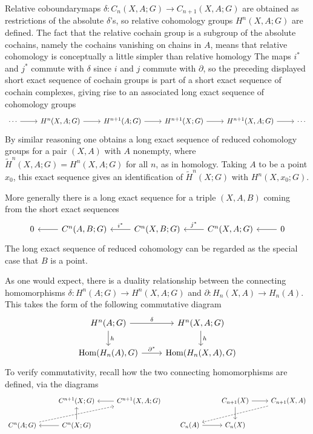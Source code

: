 Relative coboundarymaps $\delta:C_n(X,A;G)\to C_{n+1}(X,A;G)$ are obtained as restrictions of the absolute $\delta$'s, so relative cohomology groups $H^n(X,A;G)$ are defined. The fact that the relative cochain group is a subgroup of the absolute cochains, namely the cochains vanishing on chains in $A$, means that relative cohomology is conceptually a little simpler than relative homology The maps $i^*$ and $j^*$ commute with $\delta$ since $i$ and $j$ commute with $\partial$, so the preceding displayed short exact sequence of cochain groups is part of a short exact sequence of cochain complexes, giving rise to an associated long exact sequence of cohomology groups
\[\begin{tikzcd}
\cdots\ar[r]&H^n(X,A;G)\ar[r]&H^{n+1}(A;G)\ar[r]&H^{n+1}(X;G)\ar[r]&H^{n+1}(X,A;G)\ar[r]&\cdots
\end{tikzcd}\]
By similar reasoning one obtains a long exact sequence of reduced cohomology groups for a pair $(X,A)$ with $A$ nonempty, where $\widetilde{H}^n(X,A;G)=H^n(X,A;G)$ for all $n$, as in homology. Taking $A$ to be a point $x_0$, this exact sequence gives an identification of $\widetilde{H}^n(X;G)$ with $H^n(X,x_0;G)$.\par
More generally there is a long exact sequence for a triple $(X,A,B)$ coming from
the short exact sequences
\[\begin{tikzcd}
0&C^n(A,B;G)\ar[l]&C^n(X,B;G)\ar[l,swap,"i^*"]&C^n(X,A;G)\ar[l,swap,"j^*"]&0\ar[l]
\end{tikzcd}\]
The long exact sequence of reduced cohomology can be regarded as the special case that $B$ is a point.\par
As one would expect, there is a duality relationship between the connecting homomorphisms $\delta:H^n(A;G)\to H^n(X,A;G)$ and $\partial:H_n(X,A)\to H_n(A)$. This takes the form of the following commutative diagram
\[\begin{tikzcd}
H^n(A;G)\ar[r,"\delta"]\ar[d,"h"]&H^n(X,A;G)\ar[d,"h"]\\
\Hom(H_n(A),G)\ar[r,"\partial^*"]&\Hom(H_n(X,A),G)
\end{tikzcd}\]
To verify commutativity, recall how the two connecting homomorphisms are defined, via the diagrams
\[\begin{tikzcd}
&C^{n+1}(X;G)&C^{n+1}(X,A;G)\ar[l]\\
C^n(A;G)\ar[rru,dashed]&C^n(X;G)\ar[l]\ar[u]
\end{tikzcd}\quad\quad\begin{tikzcd}
&C_{n+1}(X)\ar[r]\ar[d]&C_{n+1}(X,A)\ar[lld,dashed]\\
C_n(A)\ar[r]&C_n(X)&
\end{tikzcd}\]
